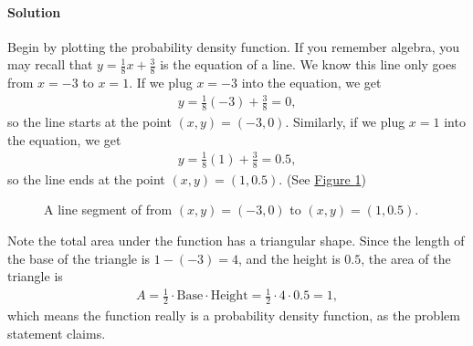 \documentclass[letterpaper,10pt,english]{jupyterBook}
\begin{document}
\paragraph{Solution}
\label{\detokenize{Ch3 Probability/3.7 Continuous Probability Distributions:id5}}
\sphinxAtStartPar
Begin by plotting the probability density function. If you remember algebra, you may recall that \(y = \frac{1}{8}x + \frac{3}{8}\) is the equation of a line. We know this line only goes from \(x = -3\) to \(x = 1\). If we plug \(x = -3\) into the equation, we get
\begin{equation*}
\begin{split} y = \frac{1}{8}(-3) + \frac{3}{8} = 0, \end{split}
\end{equation*}
\sphinxAtStartPar
so the line starts at the point \((x, y) = (-3, 0)\). Similarly, if we plug \(x = 1\) into the equation, we get
\begin{equation*}
\begin{split} y = \frac{1}{8}(1) + \frac{3}{8} = 0.5, \end{split}
\end{equation*}
\sphinxAtStartPar
so the line ends at the point \((x, y) = (1, 0.5)\). (See \hyperref[\detokenize{Ch3 Probability/3.7 Continuous Probability Distributions:pdf-tri2}]{Figure \ref{\detokenize{Ch3 Probability/3.7 Continuous Probability Distributions:pdf-tri2}}})

\begin{figure}[htbp]
\centering
\capstart

\noindent{}
\caption{A line segment of from \((x, y) = (-3, 0)\) to \((x, y) = (1, 0.5)\).}\label{\detokenize{Ch3 Probability/3.7 Continuous Probability Distributions:pdf-tri2}}\end{figure}

\sphinxAtStartPar
Note the total area under the function has a triangular shape. Since the length of the base of the triangle is \(1 - (-3) = 4\), and the height is \(0.5\), the area of the triangle is
\begin{equation*}
\begin{split} A = \frac{1}{2} \cdot \text{Base} \cdot \text{Height} = \frac{1}{2} \cdot 4 \cdot 0.5 = 1, \end{split}
\end{equation*}
\sphinxAtStartPar
which means the function really is a probability density function, as the problem statement claims.
\end{document}
